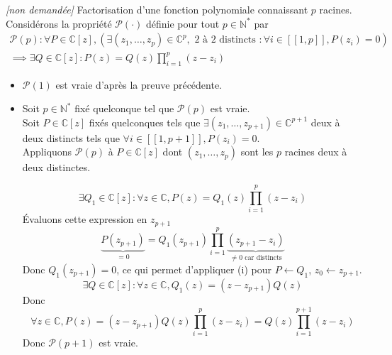\documentclass{article}
\renewenvironment{question_kholle}[2][ ]
{
	\subsection{\texorpdfstring{#2}{}}
	\notblank{#1}
	{
		\noindent #1
		\bigbreak
	}
	{}
	\begin{proof}
}
{
	\end{proof}
}
\begin{document}
  {\textit{[non demandée]} Factorisation d'une fonction polynomiale connaissant $p$ racines.}
  Considérons la propriété $\mathcal{P}(\cdot)$ définie pour tout $p \in \mathbb{N}^{*}$ par
  \begin{multline*}
    \mathcal{P}(p) : \forall P \in \mathbb{C}[z], (\exists (z_{1}, \dots, z_{p}) \in \mathbb{C}^{p}, \text{ 2 à 2 distincts }: \forall i \in [ \! [ 1, p ] \!], P(z_{i}) = 0)\\
    \implies \exists Q \in \mathbb{C}[z]: P(z) = Q(z) \prod_{i=1}^{p}(z-z_{i})
  \end{multline*}
  \begin{itemize}[label=$\lozenge$]
    \item $\mathcal{P}(1)$ est vraie d'après la preuve précédente.
    \item Soit $p \in \mathbb{N}^{*}$ fixé quelconque tel que $\mathcal{P}(p)$ est vraie.\\
          Soit $P \in \mathbb{C}[z]$ fixés quelconques tels que $\exists (z_{1}, \dots, z_{p+1}) \in \mathbb{C} ^{p+1}$ deux à deux distincts tels que $\forall i \in [ \! [ 1, p + 1 ] \!], P(z_{i}) = 0$.\\
          Appliquons $\mathcal{P}(p)$ à $P \in \mathbb{C}[z]$ dont $(z_{1}, \dots, z_{p})$ sont les $p$ racines deux à deux distinctes.

          $$\exists Q_{1} \in \mathbb{C}[z]:\forall z \in \mathbb{C}, P(z) = Q_{1}(z)\prod_{i=1}^{p}(z-z_{i})$$
          Évaluons cette expression en $z_{p+1}$
          $$\underbrace{ P(z_{p+1}) }_{ =0 } = Q_{1}(z_{p+1}) \prod_{i=1}^{p}\underbrace{ (z_{p+1}-z_{i}) }_{ \neq 0 \text{ car distincts} }$$
          Donc $Q_{1}(z_{p+1}) = 0$, ce qui permet d'appliquer (i) pour $P \leftarrow Q_{1}$, $z_{0} \leftarrow z_{p+1}$.
          $$
            \exists Q \in \mathbb{C}[z]:\forall z \in \mathbb{C}, Q_{1}(z)=(z-z_{p+1})Q(z)
          $$
          Donc
          $$
            \forall z \in \mathbb{C}, P(z) = (z-z_{p+1})Q(z) \prod_{i=1}^{p}(z-z_{i}) = Q(z) \prod_{i=1}^{p+1}(z-z_{i})
          $$
          Donc $\mathcal{P}(p+1)$ est vraie.
  \end{itemize}
\end{question_kholle}
\end{document}
